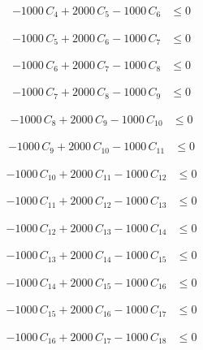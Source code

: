 \documentclass[a4paper,11pt]{article}
\begin{document}
\begin{align}
-1000\,C_{4} + 2000\,C_{5} - 1000\,C_{6} &\leq 0 \nonumber
\end{align}

\begin{align}
-1000\,C_{5} + 2000\,C_{6} - 1000\,C_{7} &\leq 0 \nonumber
\end{align}

\begin{align}
-1000\,C_{6} + 2000\,C_{7} - 1000\,C_{8} &\leq 0 \nonumber
\end{align}

\begin{align}
-1000\,C_{7} + 2000\,C_{8} - 1000\,C_{9} &\leq 0 \nonumber
\end{align}

\begin{align}
-1000\,C_{8} + 2000\,C_{9} - 1000\,C_{10} &\leq 0 \nonumber
\end{align}

\begin{align}
-1000\,C_{9} + 2000\,C_{10} - 1000\,C_{11} &\leq 0 \nonumber
\end{align}

\begin{align}
-1000\,C_{10} + 2000\,C_{11} - 1000\,C_{12} &\leq 0 \nonumber
\end{align}

\begin{align}
-1000\,C_{11} + 2000\,C_{12} - 1000\,C_{13} &\leq 0 \nonumber
\end{align}

\begin{align}
-1000\,C_{12} + 2000\,C_{13} - 1000\,C_{14} &\leq 0 \nonumber
\end{align}

\begin{align}
-1000\,C_{13} + 2000\,C_{14} - 1000\,C_{15} &\leq 0 \nonumber
\end{align}

\begin{align}
-1000\,C_{14} + 2000\,C_{15} - 1000\,C_{16} &\leq 0 \nonumber
\end{align}

\begin{align}
-1000\,C_{15} + 2000\,C_{16} - 1000\,C_{17} &\leq 0 \nonumber
\end{align}

\begin{align}
-1000\,C_{16} + 2000\,C_{17} - 1000\,C_{18} &\leq 0 \nonumber
\end{align}
\end{document}
